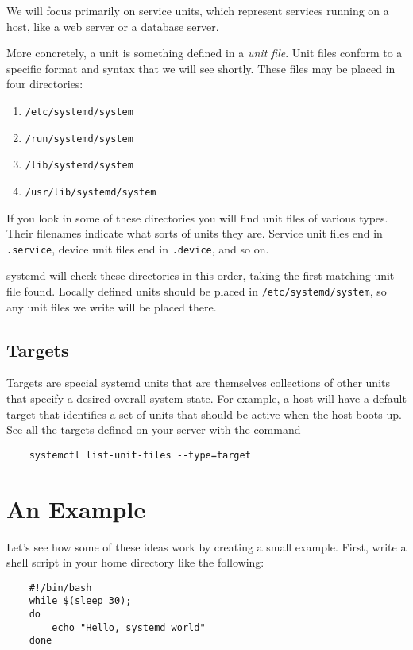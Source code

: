 \documentclass{article}
\begin{document}
We will focus primarily on service units, which represent services running on a host, like a web server or a database server.

\newpage

More concretely, a unit is something defined in a \emph{unit file}. Unit files conform to a specific format and syntax that we will see shortly. These files may be placed in four directories:

\begin{enumerate}
 \item \texttt{/etc/systemd/system}
 \item \texttt{/run/systemd/system}
 \item \texttt{/lib/systemd/system}
 \item \texttt{/usr/lib/systemd/system}
\end{enumerate}

If you look in some of these directories you will find unit files of various types. Their filenames indicate what sorts of units they are. Service unit files end in \texttt{.service}, device unit files end in \texttt{.device}, and so on.

systemd will check these directories in this order, taking the first matching unit file found. Locally defined units should be placed in \texttt{/etc/systemd/system}, so any unit files we write will be placed there.

\subsection*{Targets}
Targets are special systemd units that are themselves collections of other units that specify a desired overall system state. For example, a host will have a default target that identifies a set of units that should be active when the host boots up. See all the targets defined on your server with the command 

\begin{verbatim}
    systemctl list-unit-files --type=target
\end{verbatim}

\section{An Example}
Let's see how some of these ideas work by creating a small example. First, write a shell script in your home directory like the following:

\begin{verbatim}
    #!/bin/bash
    while $(sleep 30);
    do
        echo "Hello, systemd world"
    done
\end{verbatim}
\end{document}
